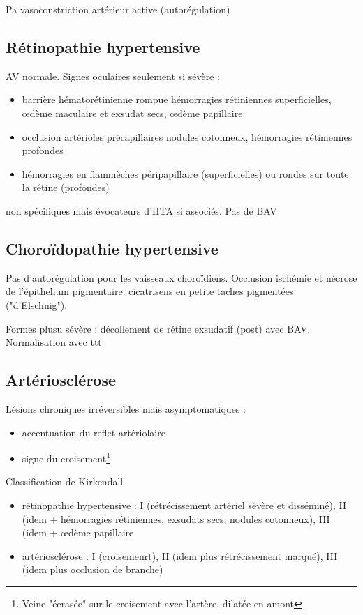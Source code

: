 \documentclass[11pt]{article}
\begin{document}
\inc Pa \thus vasoconstriction artérieur active (autorégulation)

\subsection{Rétinopathie hypertensive}
\label{sec:org84e5110}
AV normale. Signes oculaires seulement si sévère :
\begin{itemize}
\item barrière hématorétinienne rompue \thus hémorragies rétiniennes superficielles,
\oe{}dème maculaire et exsudat secs, \oe{}dème papillaire
\item occlusion artérioles précapillaires \thus nodules cotonneux, hémorragies
rétiniennes profondes
\item hémorragies en flammèches péripapillaire (superficielles) ou rondes sur toute
la rétine (profondes)
\end{itemize}
\thus non spécifiques mais évocateurs d'HTA si associés. Pas de BAV

\subsection{Choroïdopathie hypertensive}
\label{sec:orgdf35914}
Pas d'autorégulation pour les vaisseaux choroïdiens. Occlusion \thus ischémie et
nécrose de l'épithelium pigmentaire. cicatrisens en petite taches pigmentées
("d'Elschnig").

Formes plusu sévère : décollement de rétine exsudatif (post) avec
BAV. Normalisation avec ttt

\subsection{Artériosclérose}
\label{sec:org0af9bd2}
Lésions chroniques irréversibles mais asymptomatiques :
\begin{itemize}
\item accentuation du reflet artériolaire
\item signe du croisement\footnote{Veine "écrasée" sur le croisement avec l'artère, dilatée en amont}
\end{itemize}


Classification de Kirkendall 
\begin{itemize}
\item rétinopathie hypertensive : I (rétrécissement artériel sévère et disséminé),
II (idem + hémorragies rétiniennes, exsudats secs, nodules cotonneux), III
(idem + \oe{}dème papillaire
\item artériosclérose : I (croisemenrt), II (idem plus rétrécissement marqué), III
(idem plus occlusion de branche)
\end{itemize}

\printglossaries
\end{document}
